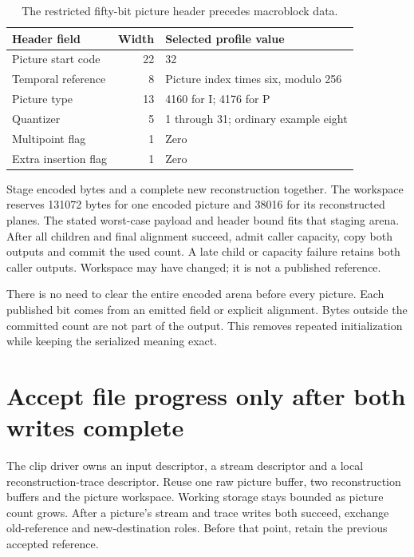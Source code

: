 \begin{table}[!ht]
  \centering
  \begin{tabular}{l r l}
    \toprule
    Header field         & Width & Selected profile value               \\
    \midrule
    Picture start code   & 22    & 32                                   \\
    Temporal reference   & 8     & Picture index times six, modulo 256  \\
    Picture type         & 13    & 4160 for I; 4176 for P               \\
    Quantizer            & 5     & 1 through 31; ordinary example eight \\
    Multipoint flag      & 1     & Zero                                 \\
    Extra insertion flag & 1     & Zero                                 \\
    \bottomrule
  \end{tabular}
  \caption{The restricted fifty-bit picture header precedes macroblock data.}
\end{table}

Stage encoded bytes and a complete new reconstruction together. The workspace
reserves 131072 bytes for one encoded picture and 38016 for its reconstructed
planes. The stated worst-case payload and header bound fits that staging arena.
After all children and final alignment succeed, admit caller capacity, copy both
outputs and commit the used count. A late child or capacity failure retains both
caller outputs. Workspace may have changed; it is not a published reference.

There is no need to clear the entire encoded arena before every picture.
Each published bit comes from an emitted field or explicit alignment. Bytes
outside the committed count are not part of the output. This removes repeated
initialization while keeping the serialized meaning exact.

\section{Accept file progress only after both writes complete}

The clip driver owns an input descriptor, a stream descriptor and a local
reconstruction-trace descriptor. Reuse one raw picture buffer, two reconstruction
buffers and the picture workspace. Working storage stays bounded as picture
count grows. After a picture's stream and trace writes both succeed, exchange
old-reference and new-destination roles. Before that point, retain the previous
accepted reference.

